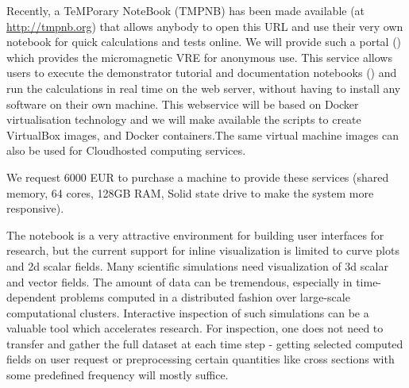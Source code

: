 \begin{workpackage}
\begin{tasklist}
\begin{task}[lead=USO,title=Demonstrator: micromagnetic VRE notebooks,
  id=oommf-tutorial-and-documentation, PM=6]
\end{task}

\begin{task}[lead=USO,id=oommf-nb-ve,title=Online portal for
  micromagnetic VRE demonstrator,PM=3]

  Recently, a TeMPorary \Jupyter NoteBook (TMPNB) has been made
  available (at \href{http://tmpnb.org}{http://tmpnb.org}) that allows
  anybody to open this URL and use their very own \Jupyter notebook
  for quick calculations and tests online. We will provide such a
  portal () which provides the micromagnetic VRE for anonymous use. This
  service allows users to execute the demonstrator tutorial and
  documentation notebooks
  () and run the
  calculations in real time on the web server, without having to
  install any software on their own machine.  This webservice will be
  based on Docker \cite{Docker} virtualisation technology and we will
  make available the scripts to create VirtualBox \cite{Virtualbox}
  images, and Docker containers.The same virtual machine images can
  also be used for Cloudhosted computing services.

  We request 6000 EUR to purchase a machine to provide these
  services (shared memory, 64 cores, 128GB RAM, Solid state drive
  to make the system more responsive).
\end{task}


\begin{task}[title=Visualization system for 3d data in web-notebook
, id=cfd-vis]

The \Jupyter notebook is a very attractive environment for building
user interfaces for research, but the current support for inline
visualization is limited to curve plots and 2d scalar fields.  Many
scientific simulations need visualization of 3d scalar and vector
fields.  The amount of data can be tremendous, especially in
time-dependent problems computed in a distributed fashion over
large-scale computational clusters. Interactive inspection of such
simulations can be a valuable tool which accelerates research. For
inspection, one does not need to transfer and gather the full dataset
at each time step - getting selected computed fields on user request
or preprocessing certain quantities like cross sections with some
predefined frequency will mostly suffice.


\end{task}
\end{tasklist}
\end{workpackage}

